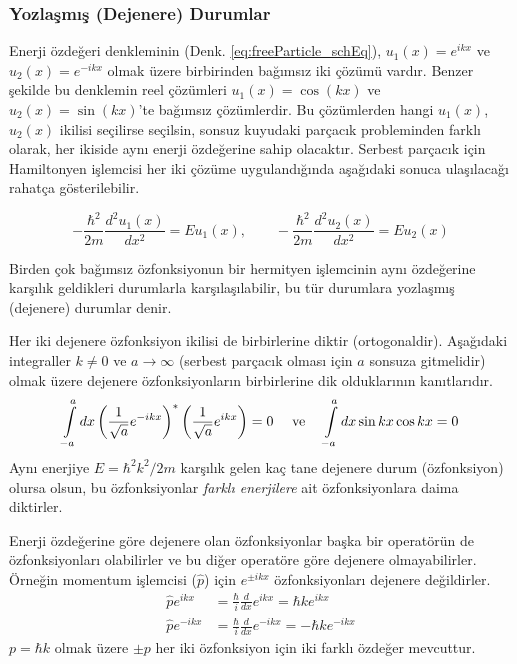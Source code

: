 \documentclass[a4paper,12pt, twoside]{article}
\begin{document}
\subsubsection{Yozlaşmış (Dejenere) Durumlar}

Enerji özdeğeri denkleminin (Denk. \ref{eq:freeParticle_schEq}), $u_1(x) = e^{i k x}$ ve $u_2(x) = e^{-i k x}$  olmak üzere birbirinden bağımsız iki çözümü vardır. Benzer şekilde bu denklemin reel çözümleri $u_1(x) = \cos(kx)$ ve $u_2(x) = \sin(kx)$'te bağımsız çözümlerdir. Bu çözümlerden hangi $u_1(x)$, $u_2(x)$ ikilisi seçilirse seçilsin, sonsuz kuyudaki parçacık probleminden farklı olarak, her ikiside aynı enerji özdeğerine sahip olacaktır. Serbest parçacık için Hamiltonyen işlemcisi her iki çözüme uygulandığında aşağıdaki sonuca ulaşılacağı rahatça gösterilebilir.

\begin{equation}
-\frac{ \hbar ^ { 2 } } { 2 m} \frac { d ^ { 2 } u_1 ( x ) } { d x ^ { 2 } }  =  E u_1 ( x ), \quad\quad
-\frac{ \hbar ^ { 2 } } { 2 m} \frac { d ^ { 2 } u_2 ( x ) } { d x ^ { 2 } }  =  E u_2 ( x )
\end{equation}

Birden çok bağımsız özfonksiyonun bir hermityen işlemcinin aynı özdeğerine karşılık geldikleri durumlarla karşılaşılabilir, bu tür durumlara yozlaşmış (dejenere) durumlar denir.

Her iki dejenere özfonksiyon ikilisi de birbirlerine diktir (ortogonaldir). Aşağıdaki integraller $k\neq0$ ve $a\rightarrow\infty$ (serbest parçacık olması için $a$ sonsuza gitmelidir) olmak üzere dejenere özfonksiyonların birbirlerine dik olduklarının kanıtlarıdır.
\begin{align}
	{\int\limits_{-a}^{a} d x\left(\frac{1}{\sqrt a}e^{-i k x}\right)^{*} \left(\frac{1}{\sqrt a}e^{i k x}\right)=0} \text{ \quad ve \quad }
	{\int\limits_{-a}^{a} d x \sin k x \cos k x=0}
\end{align}
Aynı enerjiye $E=\hbar^{2} k^{2} / 2 m$ karşılık gelen kaç tane dejenere durum (özfonksiyon) olursa olsun, bu özfonksiyonlar \emph{farklı enerjilere} ait özfonksiyonlara daima diktirler. 

Enerji özdeğerine göre dejenere olan özfonksiyonlar başka bir operatörün de özfonksiyonları olabilirler ve bu diğer operatöre göre dejenere olmayabilirler. Örneğin momentum işlemcisi ($\hat p$) için $e^{\pm i k x}$ özfonksiyonları dejenere değildirler.
\begin{align}
\hat p e^{i k x}&=\frac{\hbar}{i} \frac{d}{d x} e^{i k x}=\hbar k e^{i k x} \nonumber\\
\hat p e^{- i k x}&=\frac{\hbar}{i} \frac{d}{d x} e^{- i k x}=- \hbar k e^{- i k x}
\end{align}
$p=\hbar k$ olmak üzere $\pm p$ her iki özfonksiyon için iki farklı özdeğer mevcuttur.
\end{document}

